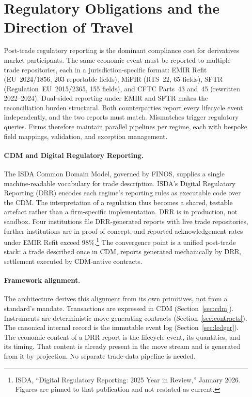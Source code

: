 \section{Regulatory Obligations and the Direction of Travel}
\label{sec:regulatory}

Post-trade regulatory reporting is the dominant compliance cost for derivatives market participants. The same economic event must be reported to multiple trade repositories, each in a jurisdiction-specific format: EMIR Refit (EU~2024/1856, 203 reportable fields), MiFIR (RTS~22, 65 fields), SFTR (Regulation~EU~2015/2365, 155 fields), and CFTC Parts~43 and~45 (rewritten 2022--2024). Dual-sided reporting under EMIR and SFTR makes the reconciliation burden structural. Both counterparties report every lifecycle event independently, and the two reports must match. Mismatches trigger regulatory queries. Firms therefore maintain parallel pipelines per regime, each with bespoke field mappings, validation, and exception management.

\paragraph{CDM and Digital Regulatory Reporting.}
The ISDA Common Domain Model, governed by FINOS, supplies a single machine-readable vocabulary for trade description. ISDA's Digital Regulatory Reporting (DRR) encodes each regime's reporting rules as executable code over the CDM. The interpretation of a regulation thus becomes a shared, testable artefact rather than a firm-specific implementation. DRR is in production, not sandbox. Four institutions file DRR-generated reports with live trade repositories, further institutions are in proof of concept, and reported acknowledgement rates under EMIR Refit exceed 98\%.\footnote{ISDA, ``Digital Regulatory Reporting: 2025 Year in Review,'' January 2026. Figures are pinned to that publication and not restated as current.} The convergence point is a unified post-trade stack: a trade described once in CDM, reports generated mechanically by DRR, settlement executed by CDM-native contracts.

\paragraph{Framework alignment.}
The architecture derives this alignment from its own primitives, not from a standard's mandate. Transactions are expressed in CDM (Section~\ref{sec:cdm}). Instruments are deterministic move-generating contracts (Section~\ref{sec:contracts}). The canonical internal record is the immutable event log (Section~\ref{sec:ledger}). The economic content of a DRR report is the lifecycle event, its quantities, and its timing. That content is already present in the move stream and is generated from it by projection. No separate trade-data pipeline is needed.

